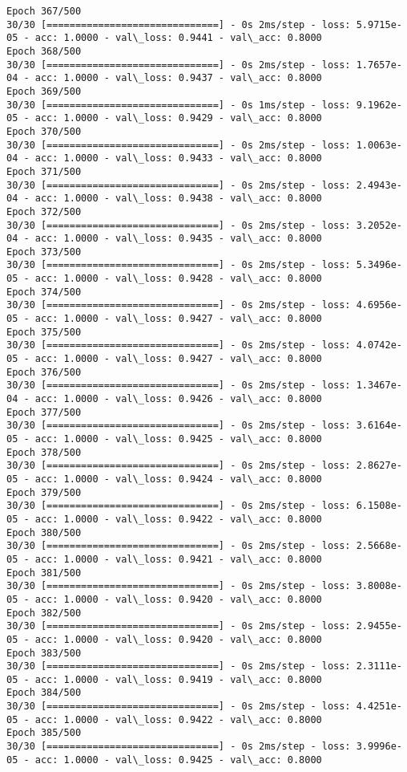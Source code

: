 \documentclass[11pt]{article}
\begin{document}
\begin{Verbatim}[commandchars=\\\{\}]
Epoch 367/500
30/30 [==============================] - 0s 2ms/step - loss: 5.9715e-05 - acc: 1.0000 - val\_loss: 0.9441 - val\_acc: 0.8000
Epoch 368/500
30/30 [==============================] - 0s 2ms/step - loss: 1.7657e-04 - acc: 1.0000 - val\_loss: 0.9437 - val\_acc: 0.8000
Epoch 369/500
30/30 [==============================] - 0s 1ms/step - loss: 9.1962e-05 - acc: 1.0000 - val\_loss: 0.9429 - val\_acc: 0.8000
Epoch 370/500
30/30 [==============================] - 0s 2ms/step - loss: 1.0063e-04 - acc: 1.0000 - val\_loss: 0.9433 - val\_acc: 0.8000
Epoch 371/500
30/30 [==============================] - 0s 2ms/step - loss: 2.4943e-04 - acc: 1.0000 - val\_loss: 0.9438 - val\_acc: 0.8000
Epoch 372/500
30/30 [==============================] - 0s 2ms/step - loss: 3.2052e-04 - acc: 1.0000 - val\_loss: 0.9435 - val\_acc: 0.8000
Epoch 373/500
30/30 [==============================] - 0s 2ms/step - loss: 5.3496e-05 - acc: 1.0000 - val\_loss: 0.9428 - val\_acc: 0.8000
Epoch 374/500
30/30 [==============================] - 0s 2ms/step - loss: 4.6956e-05 - acc: 1.0000 - val\_loss: 0.9427 - val\_acc: 0.8000
Epoch 375/500
30/30 [==============================] - 0s 2ms/step - loss: 4.0742e-05 - acc: 1.0000 - val\_loss: 0.9427 - val\_acc: 0.8000
Epoch 376/500
30/30 [==============================] - 0s 2ms/step - loss: 1.3467e-04 - acc: 1.0000 - val\_loss: 0.9426 - val\_acc: 0.8000
Epoch 377/500
30/30 [==============================] - 0s 2ms/step - loss: 3.6164e-05 - acc: 1.0000 - val\_loss: 0.9425 - val\_acc: 0.8000
Epoch 378/500
30/30 [==============================] - 0s 2ms/step - loss: 2.8627e-05 - acc: 1.0000 - val\_loss: 0.9424 - val\_acc: 0.8000
Epoch 379/500
30/30 [==============================] - 0s 2ms/step - loss: 6.1508e-05 - acc: 1.0000 - val\_loss: 0.9422 - val\_acc: 0.8000
Epoch 380/500
30/30 [==============================] - 0s 2ms/step - loss: 2.5668e-05 - acc: 1.0000 - val\_loss: 0.9421 - val\_acc: 0.8000
Epoch 381/500
30/30 [==============================] - 0s 2ms/step - loss: 3.8008e-05 - acc: 1.0000 - val\_loss: 0.9420 - val\_acc: 0.8000
Epoch 382/500
30/30 [==============================] - 0s 2ms/step - loss: 2.9455e-05 - acc: 1.0000 - val\_loss: 0.9420 - val\_acc: 0.8000
Epoch 383/500
30/30 [==============================] - 0s 2ms/step - loss: 2.3111e-05 - acc: 1.0000 - val\_loss: 0.9419 - val\_acc: 0.8000
Epoch 384/500
30/30 [==============================] - 0s 2ms/step - loss: 4.4251e-05 - acc: 1.0000 - val\_loss: 0.9422 - val\_acc: 0.8000
Epoch 385/500
30/30 [==============================] - 0s 2ms/step - loss: 3.9996e-05 - acc: 1.0000 - val\_loss: 0.9425 - val\_acc: 0.8000

\end{Verbatim}
\end{document}
